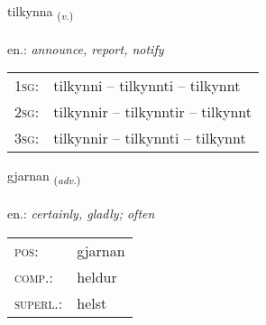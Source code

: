 \documentclass[frontgrid, backgrid]{flacards}\usepackage[]{graphicx}\usepackage[]{xcolor}
\begin{document}
\renewcommand{\flhead}{\vskip5pt \fboxsep=0pt {\small\bfseries\footnotesize Sagnorð | Verb}}
\renewcommand{\fcfoot}{\vskip5pt \fboxsep=0pt \hspace{2pt}{\small\bfseries\footnotesize 1K}}

\renewcommand{\blhead}{\vskip5pt {\small\bfseries\footnotesize Sagnorð | Verb }}
\renewcommand{\bcfoot}{\vskip5pt \hspace{2pt}{\small\bfseries\footnotesize 1K}}


{tilkynna \small{\textsubscript{(\textit{v.})}} \\[1ex] %
\textphonetic{[tʰɪlcʰɪna]} \\
en.: \emph{announce, report, notify} \\  [2ex]
\renewcommand*{\arraystretch}{0.8}
\begin{tabular}{p{1cm}l}
\textsc{1sg}: & tilkynni -- tilkynnti -- tilkynnt \\ 
\textsc{2sg}: & tilkynnir -- tilkynntir -- tilkynnt \\ 
\textsc{3sg}: & tilkynnir -- tilkynnti -- tilkynnt \\ 
\end{tabular}
}

\renewcommand{\flhead}{\vskip5pt \fboxsep=0pt {\small\bfseries\footnotesize Atviksorð | Adverb}}
\renewcommand{\fcfoot}{\vskip5pt \fboxsep=0pt \hspace{2pt}{\small\bfseries\footnotesize 1K}}

\renewcommand{\blhead}{\vskip5pt {\small\bfseries\footnotesize Atviksorð | Adverb }}
\renewcommand{\bcfoot}{\vskip5pt \hspace{2pt}{\small\bfseries\footnotesize 1K}}


{gjarnan \small{\textsubscript{(\textit{adv.})}} \\[1ex] %
\textphonetic{[cartnan]} \\
en.: \emph{certainly, gladly; often} \\  [2ex]
\renewcommand*{\arraystretch}{0.8}
\begin{tabular}{ll}
\textsc{pos}: & gjarnan \\ 
\textsc{comp.}: & heldur \\ 
\textsc{superl.}: & helst \\
\end{tabular}
}
\end{document}
